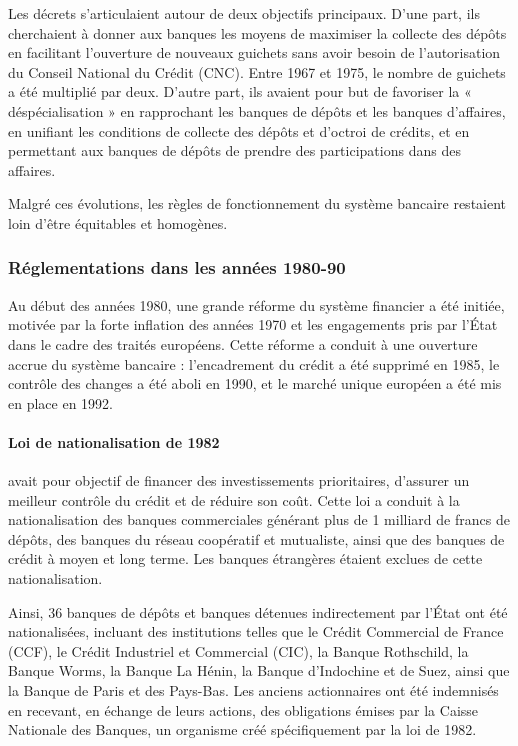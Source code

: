 \documentclass[a4paper, 12pt]{report}
\begin{document}
Les décrets s'articulaient autour de deux objectifs principaux. D'une part, ils cherchaient à donner aux banques les moyens de maximiser la collecte des dépôts en facilitant l'ouverture de nouveaux guichets sans avoir besoin de l'autorisation du Conseil National du Crédit (CNC). Entre 1967 et 1975, le nombre de guichets a été multiplié par deux. D'autre part, ils avaient pour but de favoriser la « déspécialisation » en rapprochant les banques de dépôts et les banques d'affaires, en unifiant les conditions de collecte des dépôts et d'octroi de crédits, et en permettant aux banques de dépôts de prendre des participations dans des affaires.

Malgré ces évolutions, les règles de fonctionnement du système bancaire restaient loin d'être équitables et homogènes.

\subsubsection{Réglementations dans les années 1980-90}

Au début des années 1980, une grande réforme du système financier a été initiée, motivée par la forte inflation des années 1970 et les engagements pris par l'État dans le cadre des traités européens. Cette réforme a conduit à une ouverture accrue du système bancaire : l'encadrement du crédit a été supprimé en 1985, le contrôle des changes a été aboli en 1990, et le marché unique européen a été mis en place en 1992.

\paragraph{Loi de nationalisation de 1982}

avait pour objectif de financer des investissements prioritaires, d'assurer un meilleur contrôle du crédit et de réduire son coût. Cette loi a conduit à la nationalisation des banques commerciales générant plus de 1 milliard de francs de dépôts, des banques du réseau coopératif et mutualiste, ainsi que des banques de crédit à moyen et long terme. Les banques étrangères étaient exclues de cette nationalisation.

Ainsi, 36 banques de dépôts et banques détenues indirectement par l'État ont été nationalisées, incluant des institutions telles que le Crédit Commercial de France (CCF), le Crédit Industriel et Commercial (CIC), la Banque Rothschild, la Banque Worms, la Banque La Hénin, la Banque d'Indochine et de Suez, ainsi que la Banque de Paris et des Pays-Bas. Les anciens actionnaires ont été indemnisés en recevant, en échange de leurs actions, des obligations émises par la Caisse Nationale des Banques, un organisme créé spécifiquement par la loi de 1982.
\end{document}
